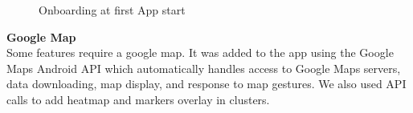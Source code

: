 \documentclass[10pt,a4paper]{article} %
\begin{document}
	\begin{figure}[H]
	  \centering
	  \hfill
	  \hfill
	  \caption{Onboarding at first App start}
	  \label{fig:onboarding}
	\end{figure}
	
	\noindent
	\textbf{Google Map}\\
    Some features require a google map. It was added to the app using the Google Maps Android API which automatically handles access to Google Maps servers, data downloading, map display, and response to map gestures. 
    We also used API calls to add heatmap and markers overlay in clusters.
\end{document}
